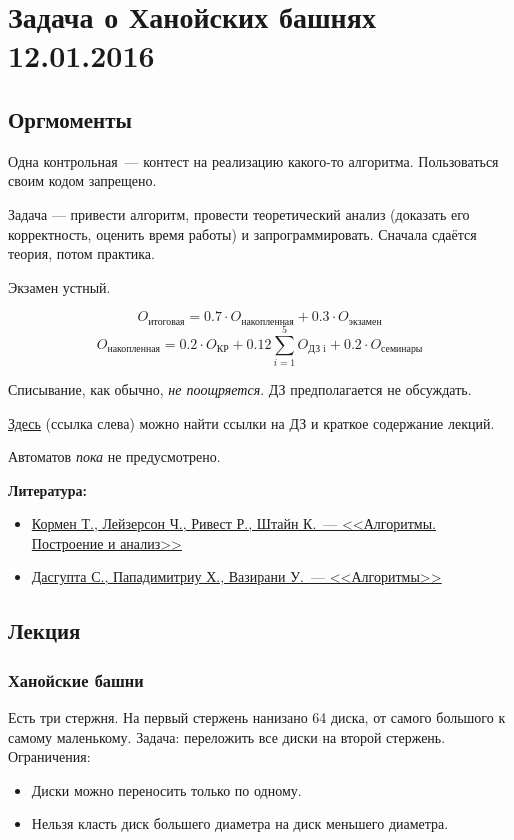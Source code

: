 \section{Задача о Ханойских башнях 12.01.2016}
\subsection*{Оргмоменты}
Одна контрольная~--- контест на реализацию какого-то алгоритма. Пользоваться своим кодом запрещено.

Задача --- привести алгоритм, провести теоретический анализ (доказать его корректность, оценить время работы) и запрограммировать. Сначала сдаётся теория, потом практика.

Экзамен устный.

\[O_{\text{итоговая}} = 0.7 \cdot O_{\text{накопленная}}+0.3 \cdot O_{\text{экзамен}}\]
\[O_{\text{накопленная}} = 0.2 \cdot O_{\text{КР}} + 0.12 \sum\limits_{i = 1}^{5} O_{\text{ДЗ i}} + 0.2 \cdot O_{\text{семинары}}\]

Списывание, как обычно, \emph{не поощряется}. ДЗ предполагается не обсуждать.

\href{http://wiki.cs.hse.ru/}{Здесь} (ссылка слева) можно найти ссылки на ДЗ и краткое содержание лекций.

Автоматов \emph{пока} не предусмотрено.

\textbf{Литература:}
\begin{itemize}
    \item \href{https://yadi.sk/i/1enAa7YHmruFw}{Кормен Т., Лейзерсон Ч., Ривест Р., Штайн К.~--- <<Алгоритмы. Построение и анализ>>}
    \item \href{https://yadi.sk/i/E_0-SVipmrvPz}{Дасгупта С., Пападимитриу Х., Вазирани У.~--- <<Алгоритмы>>}
\end{itemize}

\subsection*{Лекция}

\subsubsection*{Ханойские башни}
Есть три стержня. На первый стержень нанизано 64 диска, от самого большого к самому маленькому. Задача: переложить все диски на второй стержень. Ограничения:
\begin{itemize}
    \item Диски можно переносить только по одному.
    \item Нельзя класть диск большего диаметра на диск меньшего диаметра.
\end{itemize}

